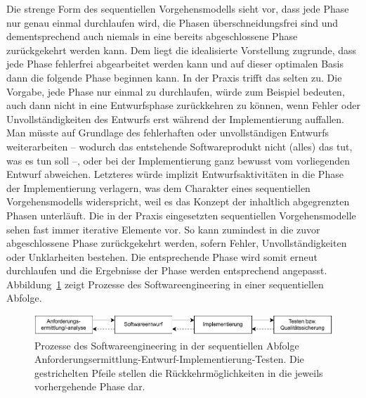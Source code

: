 \vspace{\baselineskip} %

Die strenge Form des sequentiellen Vorgehensmodells sieht vor, dass jede Phase nur genau einmal durchlaufen wird, die Phasen überschneidungsfrei sind und dementsprechend auch niemals in eine bereits abgeschlossene Phase zurückgekehrt werden kann. Dem liegt die idealisierte Vorstellung zugrunde, dass jede Phase fehlerfrei abgearbeitet werden kann und auf dieser optimalen Basis dann die folgende Phase beginnen kann. In der Praxis trifft das selten zu. Die Vorgabe, jede Phase nur einmal zu durchlaufen, würde zum Beispiel bedeuten, auch dann nicht in eine Entwurfs\-phase zurückkehren zu können, wenn Fehler oder Unvollständigkeiten des Entwurfs erst während der Implementierung auffallen. Man müsste auf Grundlage des fehlerhaften oder unvollständigen Entwurfs weiterarbeiten – wodurch das entstehende Softwareprodukt nicht (alles) das tut, was es tun soll –, oder bei der Implementierung ganz bewusst vom vorliegenden Entwurf abweichen. Letzteres würde implizit Entwurfsaktivitäten in die Phase der Implementierung verlagern, was dem Charakter eines sequentiellen Vorgehensmodells widerspricht, weil es das Konzept der inhaltlich abgegrenzten Phasen unterläuft. Die in der Praxis eingesetzten sequen\-tiel\-len Vorgehensmodelle sehen fast immer iterative Elemente vor. So kann zumindest in die zuvor abgeschlossene Phase zurückgekehrt werden, sofern Fehler, Unvollständigkeiten oder Unklarheiten bestehen. Die entsprechende Phase wird somit erneut durchlaufen und die Ergebnisse der Phase werden entsprechend angepasst. Abbildung~\ref{fig:prozesse_softwareengineering_sequentiell} zeigt Prozesse des Softwareengineering in einer sequentiellen Abfolge.

\begin{figure}[h!]
    \centering
		\includegraphics[width=1.0\textwidth]{Bilder/Kapitel-2/Abb-2-3.pdf}
    \caption[Prozesse des Softwareengineering in sequentieller Abfolge]{Prozesse des Softwareengineering in der sequentiellen Abfolge Anforderungsermittlung-Entwurf-Implementierung-Testen. Die gestrichelten Pfeile stellen die Rückkehrmöglichkeiten in die jeweils vorhergehende Phase dar.}
    \label{fig:prozesse_softwareengineering_sequentiell}
\end{figure}


